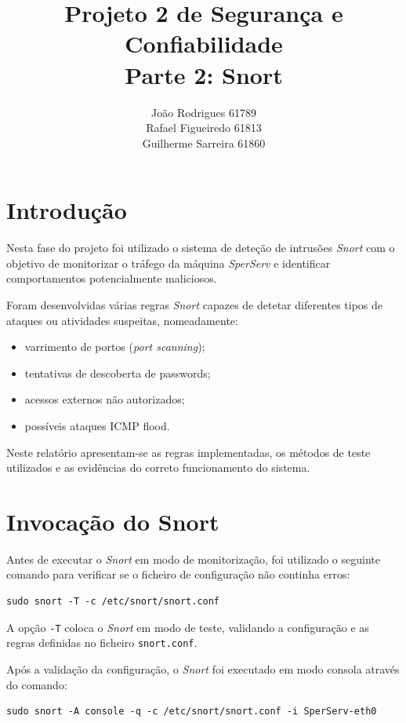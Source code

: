 \documentclass{article}
\title{Projeto 2 de Segurança e Confiabilidade \\ Parte 2: Snort}
\author{
João Rodrigues 61789 \\
Rafael Figueiredo 61813 \\
Guilherme Sarreira 61860
}
\date{}
\begin{document}
\maketitle

\section{Introdução}

Nesta fase do projeto foi utilizado o sistema de deteção de intrusões \textit{Snort} com o objetivo de monitorizar o tráfego da máquina \textit{SperServ} e identificar comportamentos potencialmente maliciosos.

Foram desenvolvidas várias regras \textit{Snort} capazes de detetar diferentes tipos de ataques ou atividades suspeitas, nomeadamente:
\begin{itemize}
    \item varrimento de portos (\textit{port scanning});
    \item tentativas de descoberta de passwords;
    \item acessos externos não autorizados;
    \item possíveis ataques ICMP flood.
\end{itemize}

Neste relatório apresentam-se as regras implementadas, os métodos de teste utilizados e as evidências do correto funcionamento do sistema.

\section{Invocação do Snort}

Antes de executar o \textit{Snort} em modo de monitorização, foi utilizado o seguinte comando para verificar se o ficheiro de configuração não continha erros:

\begin{lstlisting}
sudo snort -T -c /etc/snort/snort.conf
\end{lstlisting}

A opção \texttt{-T} coloca o \textit{Snort} em modo de teste, validando a configuração e as regras definidas no ficheiro \texttt{snort.conf}.

Após a validação da configuração, o \textit{Snort} foi executado em modo consola através do comando:

\begin{lstlisting}
sudo snort -A console -q -c /etc/snort/snort.conf -i SperServ-eth0
\end{lstlisting}
\end{document}
